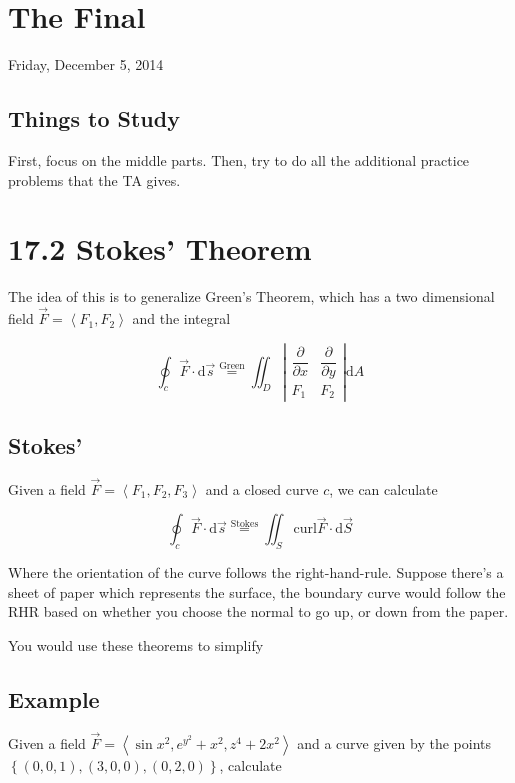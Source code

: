\documentclass{article}
\newcommand{\D}[1]{\mathrm{d}#1}
\newcommand{\partialfrac}[2]{\dfrac{\partial #1}{\partial #2}}
\begin{document}
\section*{The Final}

Friday, December 5, 2014

\subsection*{Things to Study}

First, focus on the middle parts. Then, try to do all the additional practice problems that the TA gives.

\section*{17.2 Stokes' Theorem}

The idea of this is to generalize Green's Theorem, which has a two dimensional field $\vec{F} = \left<F_1, F_2\right>$ and the integral

\[
\oint_c \vec{F} \cdot \D{\vec{s}} \overset{\text{Green}}{=} \iint_D \left|\begin{array}{cc} \partialfrac{}{x} & \partialfrac{}{y} \\ F_1 & F_2 \end{array}\right| \D{A}
\]

\subsection*{Stokes'}

Given a field $\vec{F}=\left<F_1, F_2, F_3\right>$ and a closed curve $c$, we can calculate

\[
\oint_c \vec{F} \cdot \D{\vec{s}} \overset{\text{Stokes}}{=} \iint_S \text{curl} \vec{F} \cdot \D{\vec{S}}
\]

Where the orientation of the curve follows the right-hand-rule. Suppose there's a sheet of paper which represents the surface, the boundary curve would follow the RHR based on whether you choose the normal to go up, or down from the paper.

You would use these theorems to simplify

\subsection*{Example}

Given a field $\vec{F} = \left<\sin{x^2}, e^{y^2}+x^2, z^4+2x^2\right>$ and a curve given by the points $\left\{(0,0,1), (3,0,0), (0,2,0)\right\}$, calculate
\end{document}
